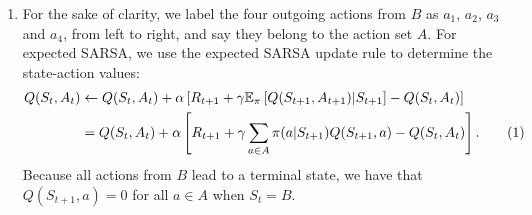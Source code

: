 \documentclass{article}
\newcommand\numberthis{\addtocounter{equation}{1}\tag{\theequation}}
\begin{document}
\begin{enumerate}
	\item For the sake of clarity, we label the four outgoing actions from $B$ as $a_1$, $a_2$, $a_3$
	      and $a_4$, from left to right, and say they belong to the action set $A$. For expected
	      SARSA, we use the expected SARSA update rule to determine the state-action values:
	      \begin{align*}
		      Q(S_t, A_t) & \leftarrow Q(S_t, A_t) + \alpha \left[ R_{t+1} + \gamma \mathbb{E}_\pi
		      \left[Q(S_{t+1}, A_{t+1})|S_{t+1}\right]  - Q(S_t, A_t) \right]                            \\
		                  & = Q(S_t, A_t) + \alpha \left[ R_{t+1} + \gamma \sum_{a \in A} \pi(a|S_{t+1})
			      Q(S_{t+1}, a) - Q(S_t, A_t) \right]. \numberthis \label{eq:expected_sarsa_update}
	      \end{align*}
	      Because all actions from $B$ lead to a terminal state, we have that $Q(S_{t+1}, a) = 0$ for
	      all $a \in A$ when $S_t = B$.


\end{enumerate}
\end{document}
